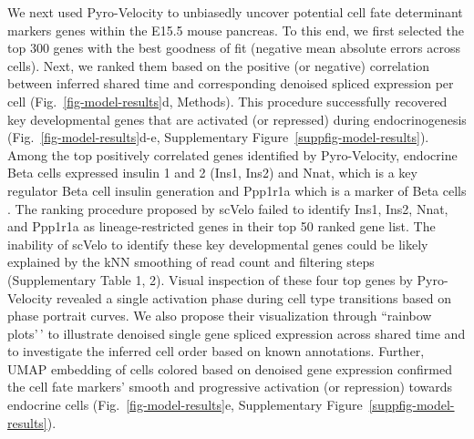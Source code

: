 \documentclass[
  sn-mathphys-num,
  lineno,
  twocolumn]{sn-jnl}
\begin{document}
We next used Pyro-Velocity to unbiasedly uncover potential cell fate
determinant markers genes within the E15.5 mouse pancreas. To this end,
we first selected the top 300 genes with the best goodness of fit
(negative mean absolute errors across cells). Next, we ranked them based
on the positive (or negative) correlation between inferred shared time
and corresponding denoised spliced expression per cell
(Fig.~\ref{fig-model-results}d, Methods). This procedure successfully
recovered key developmental genes that are activated (or repressed)
during endocrinogenesis (Fig.~\ref{fig-model-results}d-e,
Supplementary Figure~\ref{suppfig-model-results}). Among the top
positively correlated genes identified by Pyro-Velocity, endocrine Beta
cells expressed insulin 1 and 2 (Ins1, Ins2) and Nnat, which is a key
regulator Beta cell insulin generation \citep{Millership2018-vd} and
Ppp1r1a which is a marker of Beta cells \citep{Jiang2013-pt}. The
ranking procedure proposed by scVelo failed to identify Ins1, Ins2,
Nnat, and Ppp1r1a as lineage-restricted genes in their top 50 ranked
gene list. The inability of scVelo to identify these key developmental
genes could be likely explained by the kNN smoothing of read count and
filtering steps (Supplementary Table 1, 2). Visual inspection of these
four top genes by Pyro-Velocity revealed a single activation phase
during cell type transitions based on phase portrait curves. We also
propose their visualization through ``rainbow plots'\,' to illustrate
denoised single gene spliced expression across shared time and to
investigate the inferred cell order based on known annotations. Further,
UMAP embedding of cells colored based on denoised gene expression
confirmed the cell fate markers' smooth and progressive activation (or
repression) towards endocrine cells (Fig.~\ref{fig-model-results}e,
Supplementary Figure~\ref{suppfig-model-results}).
\end{document}
